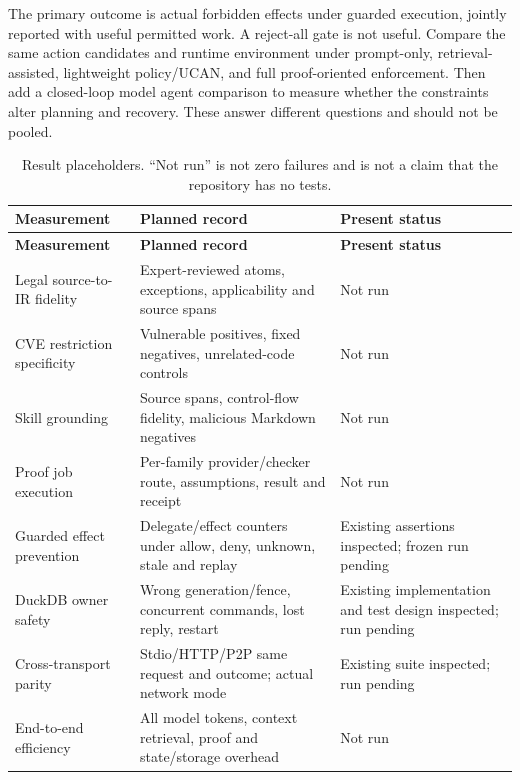 \documentclass{article}
\begin{document}
The primary outcome is actual forbidden effects under guarded execution, jointly reported with useful permitted work. A reject-all gate is not useful. Compare the same action candidates and runtime environment under prompt-only, retrieval-assisted, lightweight policy/UCAN, and full proof-oriented enforcement. Then add a closed-loop model agent comparison to measure whether the constraints alter planning and recovery. These answer different questions and should not be pooled.
\begingroup
\renewcommand{\thetable}{E1}
\begin{longtable}{@{}>{\raggedright\arraybackslash}p{.24\linewidth} >{\raggedright\arraybackslash}p{.32\linewidth} >{\raggedright\arraybackslash}p{.38\linewidth}@{}}
\caption{Result placeholders. ``Not run'' is not zero failures and is not a claim that the repository has no tests.}\label{tab:E1}\\
\toprule
\textbf{Measurement} & \textbf{Planned record} & \textbf{Present status} \\
\midrule
\endfirsthead
\textbf{Measurement} & \textbf{Planned record} & \textbf{Present status} \\
\midrule
\endhead
\bottomrule
\endlastfoot
Legal source-to-IR fidelity & Expert-reviewed atoms, exceptions, applicability and source spans & Not run \\[3pt]
CVE restriction specificity & Vulnerable positives, fixed negatives, unrelated-code controls & Not run \\[3pt]
Skill grounding & Source spans, control-flow fidelity, malicious Markdown negatives & Not run \\[3pt]
Proof job execution & Per-family provider/checker route, assumptions, result and receipt & Not run \\[3pt]
Guarded effect prevention & Delegate/effect counters under allow, deny, unknown, stale and replay & Existing assertions inspected; frozen run pending \\[3pt]
DuckDB owner safety & Wrong generation/fence, concurrent commands, lost reply, restart & Existing implementation and test design inspected; run pending \\[3pt]
Cross-transport parity & Stdio/HTTP/P2P same request and outcome; actual network mode & Existing suite inspected; run pending \\[3pt]
End-to-end efficiency & All model tokens, context retrieval, proof and state/storage overhead & Not run \\[3pt]
\end{longtable}
\endgroup
\end{document}
